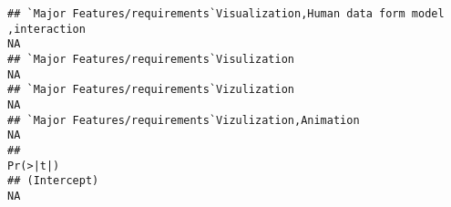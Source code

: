 \documentclass[]{article}
\begin{document}
\begin{verbatim}
## `Major Features/requirements`Visualization,Human data form model ,interaction                                                                                                                                                                                                                                                                                                                                                                                                        NA
## `Major Features/requirements`Visulization                                                                                                                                                                                                                                                                                                                                                                                                                                            NA
## `Major Features/requirements`Vizulization                                                                                                                                                                                                                                                                                                                                                                                                                                            NA
## `Major Features/requirements`Vizulization,Animation                                                                                                                                                                                                                                                                                                                                                                                                                                  NA
##                                                                                                                                                                                                                                                                                                                                                                                                                                                                                 Pr(>|t|)
## (Intercept)                                                                                                                                                                                                                                                                                                                                                                                                                                                                           NA

\end{verbatim}
\end{document}
